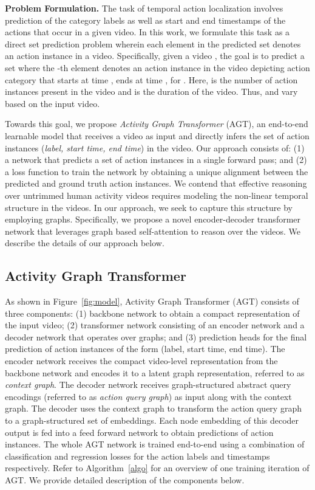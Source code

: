 \documentclass[10pt,twocolumn,letterpaper]{article}
\begin{document}
\vspace{0.05in}
\noindent
\textbf{Problem Formulation.} 
The task of temporal action localization involves prediction of the category labels as well as start and end timestamps of the actions that occur in a given video. In this work, we formulate this task as a direct set prediction problem wherein each element in the predicted set denotes an action instance in a video. Specifically, given a video , the goal is to predict a set  where the -th element  denotes an action instance in the video depicting action category  that starts at time , ends at time , for . Here,  is the number of action instances present in the video and  is the duration of the video. Thus,  and  vary based on the input video. 







Towards this goal, we propose \textit{Activity Graph Transformer} (AGT), an end-to-end learnable model that receives a video as input and directly infers the set of action instances (\textit{label, start time, end time}) in the video. Our approach consists of: (1) a network that predicts a set of action instances in a single forward pass; and (2) a loss function to train the network by obtaining a unique alignment between the predicted and ground truth action instances. 
We contend that effective reasoning over untrimmed human activity videos requires modeling the non-linear temporal structure in the videos. In our approach, we seek to capture this structure by employing graphs. 
Specifically, we propose a novel encoder-decoder transformer network
that leverages graph based self-attention to reason over the videos.
We describe the details of our approach below. 



\subsection{Activity Graph Transformer}
As shown in Figure~\ref{fig:model}, Activity Graph Transformer (AGT) consists of three components: (1) backbone network to obtain a compact representation of the input video; (2) transformer network consisting of an encoder network and a decoder network that operates over graphs; and (3) prediction heads for the final prediction of action instances of the form (label, start time, end time). The encoder network receives the compact video-level representation from the backbone network and encodes it to a latent graph representation, referred to as \textit{context graph}. The decoder network receives graph-structured abstract query encodings (referred to as \textit{action query graph}) as input along with the context graph. The decoder uses the context graph to transform the action query graph to a graph-structured set of embeddings.
Each node embedding of this decoder output is fed into a feed forward network to obtain predictions of action instances. The whole AGT network is trained end-to-end using a combination of classification and regression losses for the action labels and timestamps respectively. Refer to Algorithm~\ref{algo} for an overview of one training iteration of AGT. We provide detailed description of the components below. 
\end{document}
